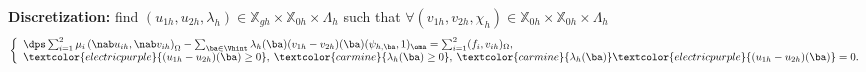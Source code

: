 \documentclass[10 pt]{beamer}
\begin{document}
\begin{frame}
\begin{itemize}
\end{itemize}
\vspace{0.5 cm}
\textbf{Discretization:}
find $(u_{1h},u_{2h},\lambda_h)\in {\mathbb{X}}_{gh} \times {\mathbb{X}}_{0h} \times \Lambda_h$  such that $\forall (v_{1h},v_{2h}, \chi_h) \in {\mathbb{X}}_{0h} \times {\mathbb{X}}_{0h} \times \Lambda_h$
\begin{equation*}
\left\lbrace\begin{array}{llccc}
\dps \sum_{i=1}^2 \mu_i \left(\nab u_{ih},\nab v_{ih}\right)_{\Omega} - \sum_{{\ba}\in \Vhint} \lambda_h({\ba})(v_{1h}-v_{2h})({\ba}) (\psi_{h,\ba}, 1)_{\oma}= \sum_{i=1}^2 (f_i,v_{ih})_{\Omega}, \\
\textcolor{electricpurple}{(u_{1h}-u_{2h})(\ba) \geq 0}, \: \textcolor{carmine}{\lambda_h(\ba) \geq 0}, \: \textcolor{carmine}{\lambda_h(\ba)} \textcolor{electricpurple}{(u_{1h}-u_{2h})(\ba)}=0.
\end{array}
\right.
\end{equation*}
\end{frame}
\end{document}
